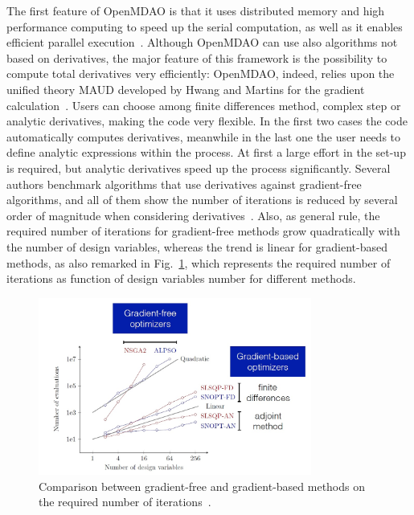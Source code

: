 The first feature of OpenMDAO is that it uses distributed memory and high performance computing to speed up the serial computation, as well as it enables efficient parallel execution~\cite{bib:balabanov, bib:hwang_2015}. 
Although OpenMDAO can use also algorithms not based on derivatives, the major feature of this framework is the possibility to compute total derivatives very efficiently: OpenMDAO, indeed, relies upon the unified theory MAUD developed by Hwang and Martins for the gradient calculation~\cite{bib:hwang_unif, bib:hwang_2018}. 
Users can choose among finite differences method, complex step or analytic derivatives, making the code very flexible. 
In the first two cases the code automatically computes derivatives, meanwhile in the last one the user needs to define analytic expressions within the process. 
At first a large effort in the set-up is required, but analytic derivatives speed up the process significantly. 
Several authors benchmark algorithms that use derivatives against gradient-free algorithms, and all of them show the number of iterations is reduced by several order of magnitude when considering derivatives~\cite{bib:martins_mdo, bib:yu_2018, bib:tedford}. 
Also, as general rule, the required number of iterations for gradient-free methods grow quadratically with the number of design variables, whereas the trend is linear for gradient-based methods, as also remarked in Fig.~\ref{fig:gradbas_vs_gradfree}, which represents the required number of iterations as function of design variables number for different methods.  
\begin{figure}[!h]
	\centering
	\includegraphics[keepaspectratio, width=0.8\textwidth]{images/chap2/gradbas_vs_gradfree.jpg}
	\caption{Comparison between gradient-free and gradient-based methods on the required number of iterations~\cite{bib:martins_2014}.}
	\label{fig:gradbas_vs_gradfree}
\end{figure}

